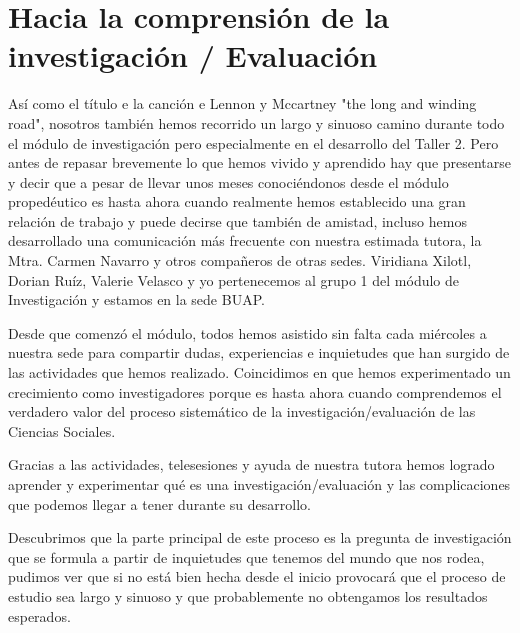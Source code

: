 \section{Hacia la comprensión de la investigación / Evaluación}

Así como el título e la canción e Lennon y Mccartney "the long and winding road", nosotros también hemos recorrido un largo y sinuoso camino durante todo el módulo de investigación pero especialmente en el desarrollo del Taller 2. Pero antes de repasar brevemente lo que hemos vivido y aprendido hay que presentarse y decir que a pesar de llevar unos meses conociéndonos desde el módulo propedéutico es hasta ahora cuando realmente hemos establecido una gran relación de trabajo y puede decirse que también de amistad, incluso hemos desarrollado una comunicación más frecuente con nuestra estimada tutora, la Mtra. Carmen Navarro y otros compañeros de otras sedes. Viridiana Xilotl, Dorian Ruíz, Valerie Velasco y yo pertenecemos al grupo 1 del módulo de Investigación y estamos en la sede BUAP.

Desde que comenzó el módulo, todos hemos asistido sin falta cada miércoles a nuestra sede para compartir dudas, experiencias  e inquietudes que han surgido de las actividades que hemos realizado.
Coincidimos en que hemos experimentado un crecimiento como investigadores porque es hasta ahora cuando comprendemos el verdadero valor del proceso sistemático de la investigación/evaluación de las Ciencias Sociales.

Gracias a las actividades, telesesiones y ayuda de nuestra tutora hemos logrado aprender y experimentar qué es una investigación/evaluación y las complicaciones que podemos llegar a tener durante su desarrollo.

Descubrimos que la parte principal de este proceso es la pregunta de investigación que se formula a partir de inquietudes que tenemos del mundo que nos rodea, pudimos ver que si no está bien hecha desde el inicio provocará que el proceso de estudio sea largo y sinuoso y que probablemente no obtengamos los resultados esperados.
